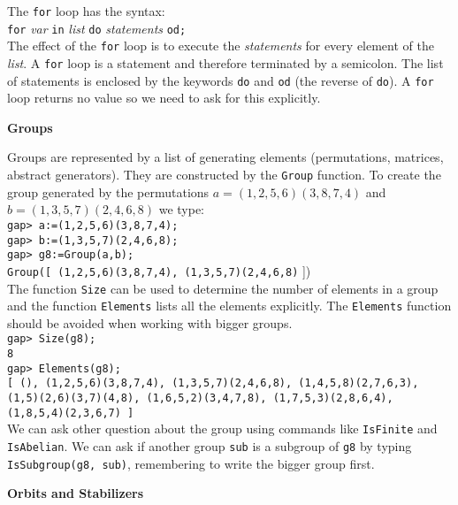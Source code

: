 \documentclass[12pt]{amsart}
\theoremstyle{definition}
\begin{document}
The \verb"for" loop has the syntax:\\
\verb"for" \emph{var} \verb"in" \emph{list} \verb"do" \emph{statements} \verb"od;"\\
The effect of the \verb"for" loop is to execute the \emph{statements} for every element of the \emph{list}. A \verb"for" loop is a statement and therefore terminated by a semicolon. The list of statements is enclosed by the keywords \verb"do" and \verb"od" (the reverse of \verb"do"). A \verb"for" loop returns no value so we need to ask for this explicitly.

\begin{center}
\textbf{Groups}
\end{center}

Groups are represented by a list of generating elements (permutations, matrices, abstract generators).  They are constructed by the \verb"Group" function.  To create the group generated by the permutations $a=(1,2,5,6)(3,8,7,4)$ and $b=(1,3,5,7)(2,4,6,8)$ we type:\\
\verb"gap> a:=(1,2,5,6)(3,8,7,4);"\\
\verb"gap> b:=(1,3,5,7)(2,4,6,8);"\\
\verb"gap> g8:=Group(a,b);"\\
\verb"Group([ (1,2,5,6)(3,8,7,4), (1,3,5,7)(2,4,6,8)" ])\\
The function \verb"Size" can be used to determine the number of elements in a group and the function \verb"Elements" lists all the elements explicitly.  The \verb"Elements" function should be avoided when working with bigger groups.\\
\verb"gap> Size(g8);"\\
\verb"8"\\
\verb"gap> Elements(g8);"\\
\verb"[ (), (1,2,5,6)(3,8,7,4), (1,3,5,7)(2,4,6,8), (1,4,5,8)(2,7,6,3),"\\
\verb"(1,5)(2,6)(3,7)(4,8), (1,6,5,2)(3,4,7,8), (1,7,5,3)(2,8,6,4),"\\
\verb"(1,8,5,4)(2,3,6,7) ]"\\
We can ask other question about the group using commands like \verb"IsFinite" and \verb"IsAbelian".  We can ask if another group \verb"sub" is a subgroup of \verb"g8" by typing \verb"IsSubgroup(g8, sub)", remembering to write the bigger group first.

\begin{center}
\textbf{Orbits and Stabilizers}
\end{center}
\end{document}
